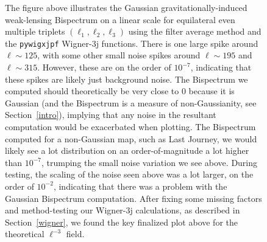 \documentclass[11pt]{article}
\renewcommand{\_}[1]{\underline{ #1 }}
\begin{document}
{\begin{figure}[H]
    \centering
    \caption{The figure above illustrates the Gaussian gravitationally-induced weak-lensing Bispectrum on a linear scale for equilateral even multiple triplets $(\ell_1, \ell_2, \ell_3)$ using the filter average method and the \texttt{pywigxjpf} Wigner-3j functions. There is one large spike around $\ell \sim 125$, with some other small noise spikes around $\ell \sim 195$ and $\ell \sim 315$. However, these are on the order of $10^{-7}$, indicating that these spikes are likely just background noise. The Bispectrum we computed should theoretically be very close to $0$ because it is Gaussian (and the Bispectrum is a measure of non-Gaussianity, see Section~\ref{intro}), implying that any noise in the resultant computation would be exacerbated when plotting. The Bispectrum computed for a non-Gaussian map, such as Last Journey, we would likely see a lot distribution on an order-of-magnitude a lot higher than $10^{-7}$, trumping the small noise variation we see above. During testing, the scaling of the noise seen above was a lot larger, on the order of $10^{-2}$, indicating that there was a problem with the Gaussian Bispectrum computation. After fixing some missing factors and method-testing our Wigner-3j calculations, as described in Section~\ref{wigner}, we found the key finalized plot above for the theoretical $\ell^{-3}$ field.}\label{fig:gauss_bispec_linear}
\end{figure}

}
\end{document}
